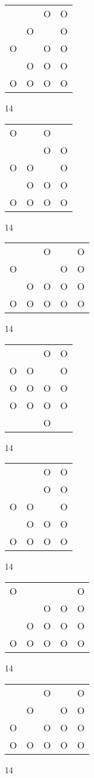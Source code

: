 \begin{tabular}{|m{0.2cm}m{0.2cm}m{0.2cm}m{0.2cm}|}\hline
 & &O&O\\
 &O& &O\\
O& &O&O\\
 &O&O&O\\
O&O&O&O\\
\hline\end{tabular}14
\begin{tabular}{|m{0.2cm}m{0.2cm}m{0.2cm}m{0.2cm}|}\hline
O& &O& \\
 & &O&O\\
O&O& &O\\
 &O&O&O\\
O&O&O&O\\
\hline\end{tabular}14
\begin{tabular}{|m{0.2cm}m{0.2cm}m{0.2cm}m{0.2cm}m{0.2cm}|}\hline
 & &O& &O\\
O& & &O&O\\
 &O&O&O&O\\
O&O&O&O&O\\
\hline\end{tabular}14
\begin{tabular}{|m{0.2cm}m{0.2cm}m{0.2cm}m{0.2cm}|}\hline
 & &O&O\\
O&O& &O\\
O&O&O&O\\
O&O&O&O\\
 & &O& \\
\hline\end{tabular}14
\begin{tabular}{|m{0.2cm}m{0.2cm}m{0.2cm}m{0.2cm}|}\hline
 & &O&O\\
 & &O&O\\
O&O& &O\\
 &O&O&O\\
O&O&O&O\\
\hline\end{tabular}14
\begin{tabular}{|m{0.2cm}m{0.2cm}m{0.2cm}m{0.2cm}m{0.2cm}|}\hline
O& & & &O\\
 & &O&O&O\\
 &O&O&O&O\\
O&O&O&O&O\\
\hline\end{tabular}14
\begin{tabular}{|m{0.2cm}m{0.2cm}m{0.2cm}m{0.2cm}m{0.2cm}|}\hline
 & &O& &O\\
 &O& &O&O\\
O& &O&O&O\\
O&O&O&O&O\\
\hline\end{tabular}14

